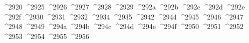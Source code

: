 {  ^^^^2920%
  ^^^^2925%
  ^^^^2926%
  ^^^^2927%
  ^^^^2928%
  ^^^^2929%
  ^^^^292a%
  ^^^^292b%
  ^^^^292c%
  ^^^^292d%
  ^^^^292e%
  ^^^^292f%
  ^^^^2930%
  ^^^^2931%
  ^^^^2932%
  ^^^^2934%
  ^^^^2935%
  ^^^^2942%
  ^^^^2944%
  ^^^^2945%
  ^^^^2946%
  ^^^^2947%
  ^^^^2948%
  ^^^^2949%
  ^^^^294a%
  ^^^^294b%
  ^^^^294c%
  ^^^^294d%
  ^^^^294e%
  ^^^^294f%
  ^^^^2950%
  ^^^^2951%
  ^^^^2952%
  ^^^^2953%
  ^^^^2954%
  ^^^^2955%
  ^^^^2956%
}
